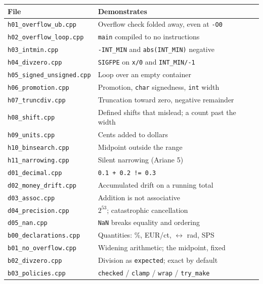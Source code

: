 \documentclass[11pt,a4paper]{article}
\newcommand{\code}[1]{\texttt{\small #1}}
\newcommand{\file}[1]{\texttt{\small #1}}
\begin{document}
\begin{center}
\small
\begin{tabular}{@{}l l@{}}
\toprule
File & Demonstrates \\
\midrule
\file{h01\_overflow\_ub.cpp}      & Overflow check folded away, even at \code{-O0} \\
\file{h02\_overflow\_loop.cpp}    & \code{main} compiled to no instructions \\
\file{h03\_intmin.cpp}            & \code{-INT\_MIN} and \code{abs(INT\_MIN)} negative \\
\file{h04\_divzero.cpp}           & \code{SIGFPE} on \code{x/0} and \code{INT\_MIN/-1} \\
\file{h05\_signed\_unsigned.cpp}  & Loop over an empty container \\
\file{h06\_promotion.cpp}         & Promotion, \code{char} signedness, \code{int} width \\
\file{h07\_truncdiv.cpp}          & Truncation toward zero, negative remainder \\
\file{h08\_shift.cpp}             & Defined shifts that mislead; a count past the width \\
\file{h09\_units.cpp}             & Cents added to dollars \\
\file{h10\_binsearch.cpp}         & Midpoint outside the range \\
\file{h11\_narrowing.cpp}         & Silent narrowing (Ariane 5) \\
\midrule
\file{d01\_decimal.cpp}           & \code{0.1 + 0.2 != 0.3} \\
\file{d02\_money\_drift.cpp}      & Accumulated drift on a running total \\
\file{d03\_assoc.cpp}             & Addition is not associative \\
\file{d04\_precision.cpp}         & $2^{53}$; catastrophic cancellation \\
\file{d05\_nan.cpp}               & \code{NaN} breaks equality and ordering \\
\midrule
\file{b00\_declarations.cpp}      & Quantities: \%, EUR/ct, \textdegree{} $\leftrightarrow$ rad, SPS \\
\file{b01\_no\_overflow.cpp}      & Widening arithmetic; the midpoint, fixed \\
\file{b02\_divzero.cpp}           & Division as \code{expected}; exact by default \\
\file{b03\_policies.cpp}          & \code{checked} / \code{clamp} / \code{wrap} / \code{try\_make} \\

\end{tabular}
\end{center}
\end{document}
